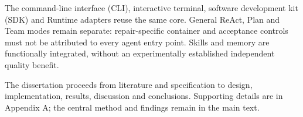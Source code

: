The command-line interface (CLI), interactive terminal, software development kit (SDK) and Runtime adapters reuse the same core. General ReAct, Plan and Team modes remain separate: repair-specific container and acceptance controls must not be attributed to every agent entry point. Skills and memory are functionally integrated, without an experimentally established independent quality benefit.

The dissertation proceeds from literature and specification to design, implementation, results, discussion and conclusions. Supporting details are in Appendix A; the central method and findings remain in the main text.
